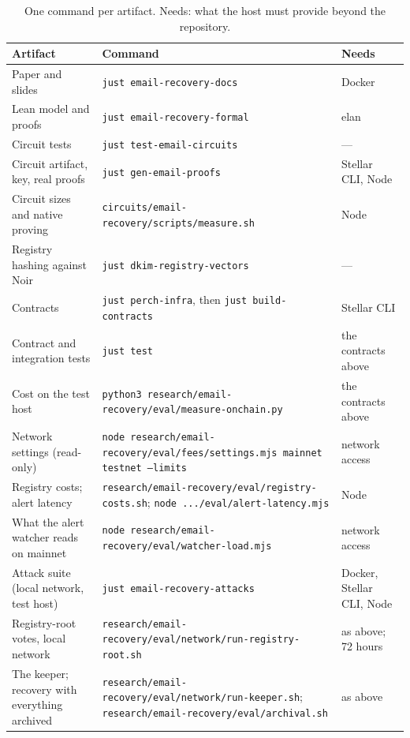 \begin{table}[t]
  \caption{One command per artifact. Needs: what the host must provide
    beyond the repository.}
  \label{tab:repro}
  \small
  \begin{tabularx}{\textwidth}{@{}>{\raggedright\arraybackslash}p{}>{\raggedright\arraybackslash}p{}>{\raggedright\arraybackslash}X@{}}
    \toprule
    Artifact & Command & Needs \\
    \midrule
    Paper and slides & \texttt{just email-recovery-docs} & Docker \\
    Lean model and proofs & \texttt{just email-recovery-formal} & elan \\
    Circuit tests & \texttt{just test-email-circuits} & --- \\
    Circuit artifact, key, real proofs & \texttt{just gen-email-proofs} & Stellar CLI, Node \\
    Circuit sizes and native proving & \texttt{circuits/email-recovery/scripts/measure.sh} & Node \\
    Registry hashing against Noir & \texttt{just dkim-registry-vectors} & --- \\
    Contracts & \texttt{just perch-infra}, then \texttt{just build-contracts} & Stellar CLI \\
    Contract and integration tests & \texttt{just test} & the contracts above \\
    Cost on the test host & \texttt{python3 research/email-recovery/eval/measure-onchain.py} & the contracts above \\
    Network settings (read-only) & \texttt{node research/email-recovery/eval/fees/settings.mjs mainnet testnet --limits} & network access \\
    Registry costs; alert latency & \texttt{research/email-recovery/eval/registry-costs.sh}; \texttt{node .../eval/alert-latency.mjs} & Node \\
    What the alert watcher reads on mainnet & \texttt{node research/email-recovery/eval/watcher-load.mjs} & network access \\
    Attack suite (local network, test host) & \texttt{just email-recovery-attacks} & Docker, Stellar CLI, Node \\
    Registry-root votes, local network & \texttt{research/email-recovery/eval/network/run-registry-root.sh} & as above; 72 hours \\
    The keeper; recovery with everything archived & \texttt{research/email-recovery/eval/network/run-keeper.sh}; \texttt{research/email-recovery/eval/archival.sh} & as above \\

\end{tabularx}
\end{table}
